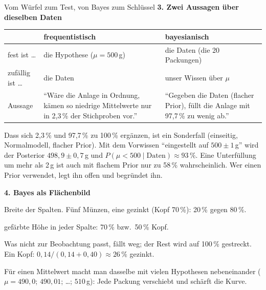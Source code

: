 \begin{handout}{Vom Würfel zum Test, von Bayes zum Schlüssel}
\textbf{3. Zwei Aussagen über dieselben Daten}
\begin{center}
\small
\begin{tabular}{@{}>{\raggedright\arraybackslash}p{}>{\raggedright\arraybackslash}p{}>{\raggedright\arraybackslash}p{}@{}}
\toprule
 & \textbf{frequentistisch} & \textbf{bayesianisch} \\
\midrule
fest ist \dots & die Hypothese ($\mu=500$\,g) & die Daten (die 20 Packungen) \\
zufällig ist \dots & die Daten & unser Wissen über $\mu$ \\
Aussage & \enquote{Wäre die Anlage in Ordnung, kämen so niedrige Mittelwerte nur in 2,3\,\% der Stichproben vor.} & \enquote{Gegeben die Daten (flacher Prior), füllt die Anlage mit 97,7\,\% zu wenig ab.} \\
\bottomrule
\end{tabular}
\end{center}
Dass sich 2,3\,\% und 97,7\,\% zu 100\,\% ergänzen, ist ein Sonderfall
(einseitig, Normalmodell, flacher Prior). Mit dem Vorwissen
\enquote{eingestellt auf $500\pm1$\,g} wird der Posterior
$498{,}9\pm0{,}7$\,g und $P(\mu<500\mid\text{Daten})\approx93\,\%$. Eine
Unterfüllung um mehr als 2\,g ist auch mit flachem Prior nur zu 58\,\%
wahrscheinlich. Wer einen Prior verwendet, legt ihn offen und begründet ihn.

\textbf{4. Bayes als Flächenbild}
\begin{description}\itemsep 0pt
  \item[Prior] Breite der Spalten. Fünf Münzen, eine gezinkt (Kopf
    70\,\%): 20\,\% gegen 80\,\%.
  \item[Likelihood] gefärbte Höhe in jeder Spalte: 70\,\% bzw.\ 50\,\%
    Kopf.
  \item[Posterior] Was nicht zur Beobachtung passt, fällt weg; der Rest
    wird auf 100\,\% gestreckt. Ein Kopf:
    $0{,}14/(0{,}14+0{,}40)\approx26\,\%$ gezinkt.
\end{description}
Für einen Mittelwert macht man dasselbe mit vielen Hypothesen
nebeneinander ($\mu=490{,}0$; $490{,}01$; \dots; $510$\,g): Jede Packung
verschiebt und schärft die Kurve.


\end{handout}
